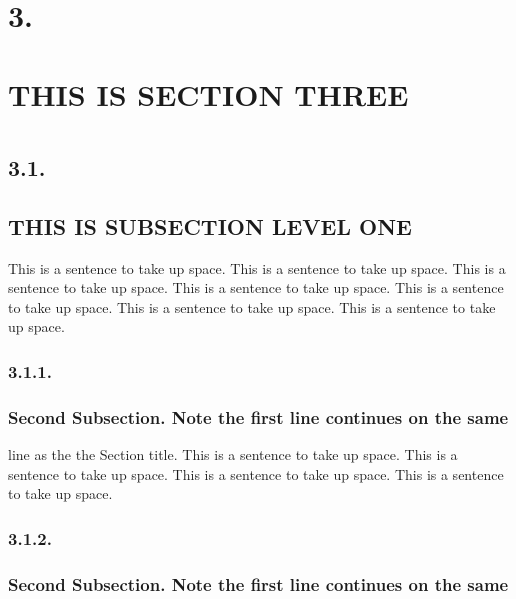 \documentclass{article}
\newcommand{\tab}{\hspace{5mm}}
\begin{document}
\section*{3.\tab }


\section*{THIS IS SECTION THREE}
\section*{}


\subsection*{3.1.\tab }


\subsection*{
THIS IS SUBSECTION LEVEL ONE}

This is a sentence to take up space. This is a sentence to take 
up space. This is a sentence to take up space. This is a sentence 
to take up space. This is a sentence to take up space. This is 
a sentence to take up space. This is a sentence to take up space.\\


\subsubsection*{3.1.1.\tab }


\subsubsection*{
Second Subsection. Note the first line continues on the same}

line as the the Section title. This is a sentence to take up 
space. This is a sentence to take up space. This is a sentence 
to take up space. This is a sentence to take up space.\\


\subsubsection*{3.1.2.\tab }


\subsubsection*{
Second Subsection. Note the first line continues on the same}
\end{document}
